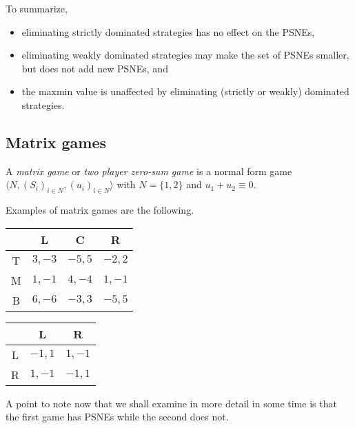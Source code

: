 	To summarize,
	\begin{itemize}
		\item eliminating strictly dominated strategies has no effect on the PSNEs,
		\item eliminating weakly dominated strategies may make the set of PSNEs smaller, but does not add new PSNEs, and
		\item the maxmin value is unaffected by eliminating (strictly or weakly) dominated strategies.
	\end{itemize}

\subsection{Matrix games}

	\begin{fdef}
		A \emph{matrix game} or \emph{two player zero-sum game} is a normal form game $\langle N , (S_i)_{i \in N} , (u_i)_{i \in N} \rangle$ with $N = \{1,2\}$ and $u_1 + u_2 \equiv 0$.
	\end{fdef}

	\begin{fex}
		\label{ex: matrix game}
		Examples of matrix games are the following.

		\begin{center}
		\begin{tabular}{|c||c|c|c|}
			\hline
			& \textsf{L} & \textsf{C} & \textsf{R} \\ \hline \hline
			\textsf{T} & $3,-3$ & $-5,5$ & $-2,2$ \\ \hline
			\textsf{M} & $1,-1$ & $4,-4$ & $1,-1$ \\ \hline
			\textsf{B} & $6,-6$ & $-3,3$ & $-5,5$ \\ \hline
		\end{tabular}
		\end{center}

		\begin{center}
		\begin{tabular}{|c||c|c|}
			\hline
			& \textsf{L} & \textsf{R} \\ \hline\hline
			\textsf{L} & $-1,1$ & $1,-1$ \\ \hline
			\textsf{R} & $1,-1$ & $-1,1$ \\ \hline
		\end{tabular}
		\end{center}

		A point to note now that we shall examine in more detail in some time is that the first game has PSNEs while the second does not.
	\end{fex}

